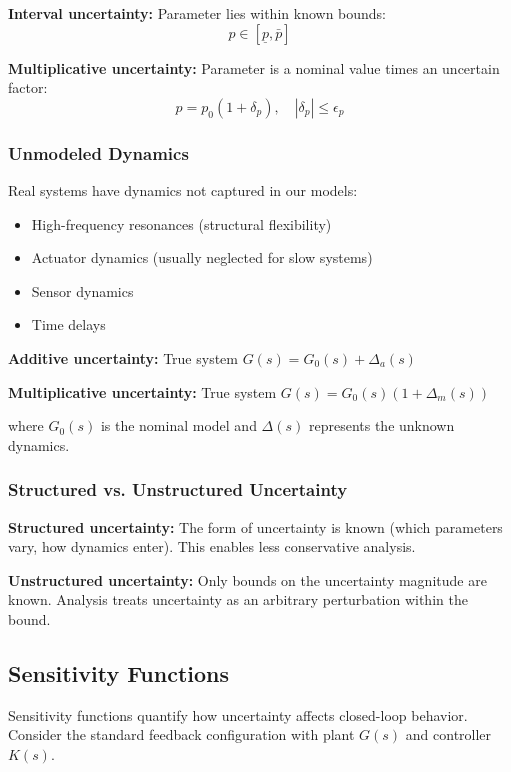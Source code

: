 \textbf{Interval uncertainty:} Parameter lies within known bounds:
\begin{equation}
p \in [\underline{p}, \bar{p}]
\end{equation}

\textbf{Multiplicative uncertainty:} Parameter is a nominal value times an uncertain factor:
\begin{equation}
p = p_0(1 + \delta_p), \quad |\delta_p| \leq \epsilon_p
\end{equation}

\subsubsection{Unmodeled Dynamics}

Real systems have dynamics not captured in our models:
\begin{itemize}
    \item High-frequency resonances (structural flexibility)
    \item Actuator dynamics (usually neglected for slow systems)
    \item Sensor dynamics
    \item Time delays
\end{itemize}

\textbf{Additive uncertainty:} True system $G(s) = G_0(s) + \Delta_a(s)$

\textbf{Multiplicative uncertainty:} True system $G(s) = G_0(s)(1 + \Delta_m(s))$

where $G_0(s)$ is the nominal model and $\Delta(s)$ represents the unknown dynamics.

\subsubsection{Structured vs. Unstructured Uncertainty}

\textbf{Structured uncertainty:} The form of uncertainty is known (which parameters vary, how dynamics enter). This enables less conservative analysis.

\textbf{Unstructured uncertainty:} Only bounds on the uncertainty magnitude are known. Analysis treats uncertainty as an arbitrary perturbation within the bound.

\subsection{Sensitivity Functions}

Sensitivity functions quantify how uncertainty affects closed-loop behavior. Consider the standard feedback configuration with plant $G(s)$ and controller $K(s)$.

